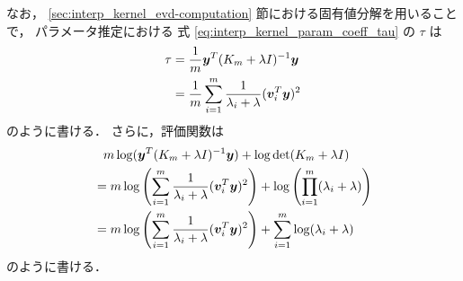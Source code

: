 なお，
\ref{sec:interp_kernel_evd-computation} 節における固有値分解を用いることで，
パラメータ推定における
式 \eqref{eq:interp_kernel_param_coeff_tau} の $\tau$ は
\begin{align}
    \tau
     & = \frac{1}{m} \bm{y}^T (K_m + \lambda I)^{-1} \bm{y} \notag                    \\
     & = \frac{1}{m} \sum_{i=1}^m \frac{1}{\lambda_i + \lambda} (\bm{v}_i^T \bm{y})^2
\end{align}
のように書ける．
さらに，評価関数は
\begin{align}
     & \hphantom{=}
    m \log(\bm{y}^T (K_m + \lambda I)^{-1} \bm{y})
    + \log{\det(K_m + \lambda I)}
    \notag                                                                                   \\
     & = m \log\left(\sum_{i=1}^m \frac{1}{\lambda_i + \lambda} (\bm{v}_i^T \bm{y})^2\right)
    + \log\left(\prod_{i=1}^m (\lambda_i + \lambda)\right)
    \notag                                                                                   \\
     & = m \log\left(\sum_{i=1}^m \frac{1}{\lambda_i + \lambda} (\bm{v}_i^T \bm{y})^2\right)
    + \sum_{i=1}^m \log(\lambda_i + \lambda)
\end{align}
のように書ける．
